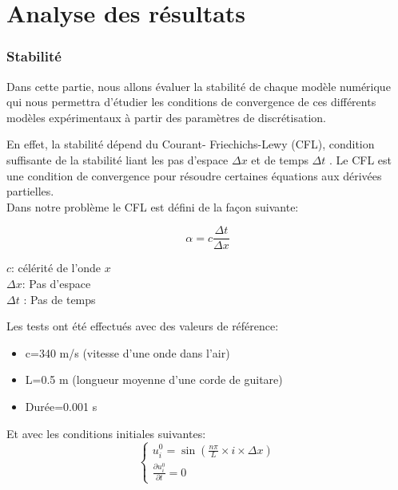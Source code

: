 \part{Analyse des résultats}


\section{Stabilité}

Dans cette partie, nous allons évaluer la stabilité de chaque modèle numérique qui nous permettra d'étudier les conditions de convergence de ces différents modèles expérimentaux à partir des paramètres de discrétisation.


En effet, la stabilité dépend du Courant- Friechichs-Lewy (CFL), condition suffisante de la stabilité liant les pas d'espace $\Delta x $ et de temps $\Delta t$ . Le CFL est une condition de convergence pour résoudre certaines équations aux dérivées partielles.\\

Dans notre problème le CFL est défini de la façon suivante:

\begin{minipage}{.6\textwidth}%
\centering
\begin{equation*}
     \alpha= c \frac{\Delta t}{\Delta x}  
\end{equation*}

\end{minipage}
\hfill
\begin{minipage}{.45\textwidth}%
\vspace{7mm}
$c$: célérité de l'onde $x$\\
$\Delta x$: Pas d'espace\\
$\Delta t$ : Pas de temps\\
     
\end{minipage}

Les tests ont été effectués avec des valeurs de référence:
\begin{itemize}
    \item c=340 m/s (vitesse d'une onde dans l'air)
    \item L=0.5 m (longueur moyenne d'une corde de guitare)
    \item Durée=0.001 s\\ 
\end{itemize}
Et avec les conditions initiales suivantes:
  \[
      \begin{cases}
        u^{0}_{i}=\sin(\frac{n \pi }{L} \times i \times \Delta x) \\
        \frac{\partial u^0_{i}}{\partial t}= 0
      \end{cases}
    \]\\


